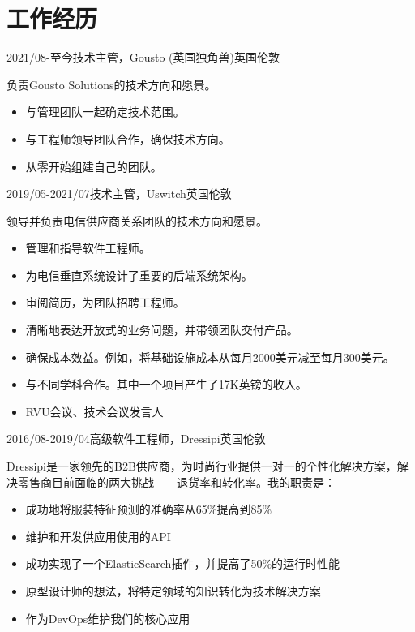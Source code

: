 \documentclass[a4paper]{twentysecondcv-chinese} %
\begin{document}
\section{工作经历}

\begin{twenty} %
	\twentyitem
	    {2021/08-至今}{技术主管，Gousto (英国独角兽)}{英国伦敦}
    	{负责Gousto Solutions的技术方向和愿景。
        	\begin{itemize}
              \item 与管理团队一起确定技术范围。
              \item 与工程师领导团队合作，确保技术方向。
              \item 从零开始组建自己的团队。
            \end{itemize}}
	\twentyitem
	    {2019/05-2021/07}{技术主管，Uswitch}{英国伦敦}
    	{领导并负责电信供应商关系团队的技术方向和愿景。
        	\begin{itemize}
              \item 管理和指导软件工程师。
              \item 为电信垂直系统设计了重要的后端系统架构。
              \item 审阅简历，为团队招聘工程师。
              \item 清晰地表达开放式的业务问题，并带领团队交付产品。
              \item 确保成本效益。例如，将基础设施成本从每月2000美元减至每月300美元。
              \item 与不同学科合作。其中一个项目产生了17K英镑的收入。
              \item RVU会议、技术会议发言人
            \end{itemize}}
	\twentyitem
	    {2016/08-2019/04}{高级软件工程师，Dressipi}{英国伦敦}
    	{Dressipi是一家领先的B2B供应商，为时尚行业提供一对一的个性化解决方案，解决零售商目前面临的两大挑战——退货率和转化率。我的职责是：
        	\begin{itemize}
              \item 成功地将服装特征预测的准确率从65\%提高到85\%
              \item 维护和开发供应用使用的API
              \item 成功实现了一个ElasticSearch插件，并提高了50\%的运行时性能
              \item 原型设计师的想法，将特定领域的知识转化为技术解决方案
              \item 作为DevOps维护我们的核心应用
            \end{itemize}}

\end{twenty}
\end{document}
